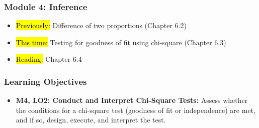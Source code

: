 
\begin{frame}
    \frametitle{Module 4: Inference}
    \begin{itemize}
        \item \hl{Previously: }Difference of two proportions (Chapter 6.2)
        \item \hl{This time: }Testing for goodness of fit using chi-square (Chapter 6.3)
        \item \hl{Reading: }Chapter 6.4
    \end{itemize}

\end{frame}
\begin{frame}
    \frametitle{Learning Objectives}
    \begin{itemize}
        \item \textbf{M4, LO2: Conduct and Interpret Chi-Square Tests:} Assess whether the conditions for a chi-square test (goodness of fit or independence) are met, and if so, design, execute, and interpret the test.
    \end{itemize}
\end{frame}
